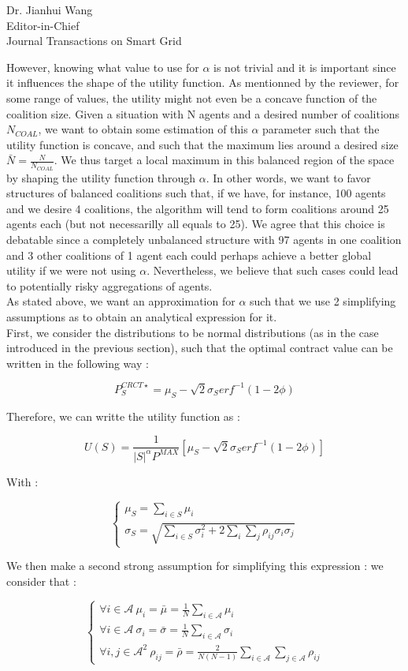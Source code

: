 \documentclass{letter}
\begin{document}
\begin{letter}{Dr. Jianhui Wang \\ Editor-in-Chief \\ Journal Transactions on Smart Grid }
\begin{itemize}
\begin{itemize}
However, knowing what value to use for $ \alpha $ is not trivial and it is important since it influences the shape of the utility function. As mentionned by the reviewer, for some range of values, the utility might not even be a concave function of the coalition size. Given a situation with N agents and a desired number of coalitions $ N_{COAL}$, we want to obtain some estimation of this $ \alpha $ parameter such that the utility function is concave, and such that the maximum lies around a desired size $ \bar{N} = \frac{N}{N_{COAL}} $. We thus target a local maximum in this balanced region of the space by shaping the utility function through $ \alpha$. In other words, we want to favor structures of balanced coalitions such that, if we have, for instance, 100 agents and we desire 4 coalitions, the algorithm will tend to form coalitions around 25 agents each (but not necessarilly all equals to 25). We agree that this choice is debatable since a completely unbalanced structure with 97 agents in one coalition and 3 other coalitions of 1 agent each could perhaps achieve a better global utility if we were not using $\alpha$. Nevertheless, we believe that such cases could lead to potentially risky aggregations of agents.
\\
As stated above, we want an approximation for $ \alpha $ such that we use 2 simplifying assumptions as to obtain an analytical expression for it.
\\
First, we consider the distributions to be normal distributions (as in the case introduced in the previous section), such that the optimal contract value can be written in the following way :

\[ P_S^{CRCT \star } = \mu_S - \sqrt{2} \sigma_S erf^{-1}(1 - 2 \phi) \]

Therefore, we can writte the utility function as :

\[ U(S) = \frac{1}{|S|^{\alpha} P^{MAX} } \left[ \mu_S - \sqrt{2} \sigma_S erf^{-1}(1 - 2 \phi) \right] \]

With : 

\[ \left\{ \begin{array}{lll} \mu_{S} = \sum_{i \in S} \mu_i \\ \sigma_{S} = \sqrt{ \sum_{i \in S} \sigma_i^2 + 2 \sum_{i} \sum_{j} \rho_{ij} \sigma_i \sigma_j } \end{array} \right. \]

We then make a second strong assumption for simplifying this expression : we consider that :

\[ \left\{ \begin{array}{lll} \forall i \in \mathcal{A}\ \mu_i = \bar{ \mu } = \frac{1}{N} \sum_{i \in \mathcal{A}} \mu_i  \\ \forall i \in \mathcal{A}\ \sigma_i = \bar{ \sigma } = \frac{1}{N} \sum_{i \in \mathcal{A}} \sigma_i \\ \forall i,j \in \mathcal{A}^2\  \rho_{ij} = \bar{ \rho } = \frac{2}{N(N-1)} \sum_{i \in \mathcal{A}} \sum_{j \in \mathcal{A}} \rho_{ij} \end{array} \right.\]


\end{itemize}
\end{itemize}
\end{letter}
\end{document}
